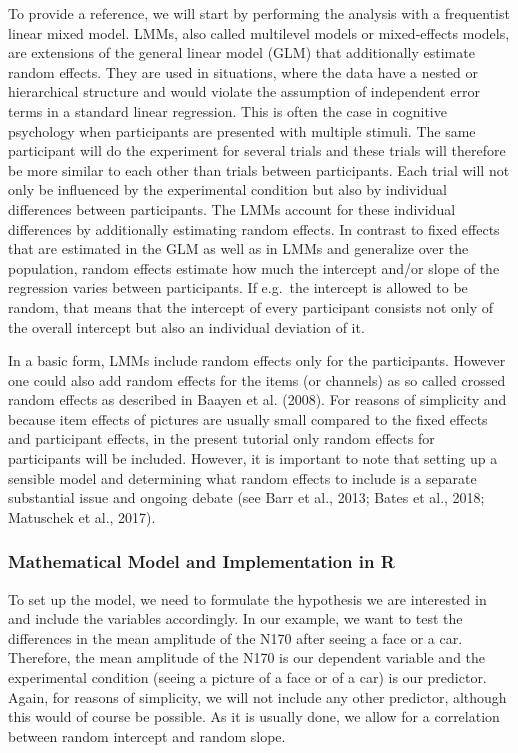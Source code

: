 \documentclass[
  doc,12pt,floatsintext]{apa7}
\begin{document}
To provide a reference, we will start by performing the analysis with a frequentist linear mixed model. LMMs, also called multilevel models or mixed-effects models, are extensions of the general linear model (GLM) that additionally estimate random effects. They are used in situations, where the data have a nested or hierarchical structure and would violate the assumption of independent error terms in a standard linear regression. This is often the case in cognitive psychology when participants are presented with multiple stimuli. The same participant will do the experiment for several trials and these trials will therefore be more similar to each other than trials between participants. Each trial will not only be influenced by the experimental condition but also by individual differences between participants. The LMMs account for these individual differences by additionally estimating random effects. In contrast to fixed effects that are estimated in the GLM as well as in LMMs and generalize over the population, random effects estimate how much the intercept and/or slope of the regression varies between participants. If e.g.~the intercept is allowed to be random, that means that the intercept of every participant consists not only of the overall intercept but also an individual deviation of it.

In a basic form, LMMs include random effects only for the participants. However one could also add random effects for the items (or channels) as so called crossed random effects as described in Baayen et al. (2008). For reasons of simplicity and because item effects of pictures are usually small compared to the fixed effects and participant effects, in the present tutorial only random effects for participants will be included. However, it is important to note that setting up a sensible model and determining what random effects to include is a separate substantial issue and ongoing debate (see Barr et al., 2013; Bates et al., 2018; Matuschek et al., 2017).

\subsubsection{Mathematical Model and Implementation in R}\label{mathematical-model-and-implementation-in-r}

To set up the model, we need to formulate the hypothesis we are interested in and include the variables accordingly. In our example, we want to test the differences in the mean amplitude of the N170 after seeing a face or a car. Therefore, the mean amplitude of the N170 is our dependent variable and the experimental condition (seeing a picture of a face or of a car) is our predictor. Again, for reasons of simplicity, we will not include any other predictor, although this would of course be possible. As it is usually done, we allow for a correlation between random intercept and random slope.
\end{document}
